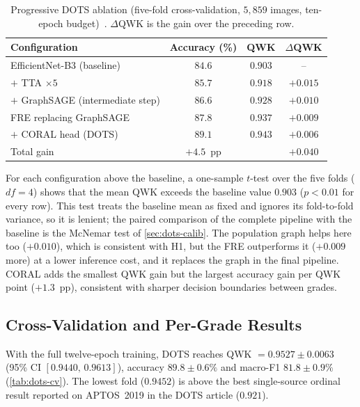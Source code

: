 \begin{table}[!htbp]
\centering
\caption[Progressive DOTS ablation]{Progressive DOTS ablation (five-fold cross-validation,
$5{,}859$ images, ten-epoch budget)~\cite{belhadj2026dots}. $\Delta$QWK is the gain over the
preceding row.}
\label{tab:ablate}
\small
\begin{tabular}{@{}lccc@{}}
\toprule
Configuration & Accuracy (\%) & QWK & $\Delta$QWK \\
\midrule
EfficientNet-B3 (baseline) & $84.6$ & $0.903$ & -- \\
$+$ TTA $\times5$ & $85.7$ & $0.918$ & $+0.015$ \\
$+$ GraphSAGE (intermediate step) & $86.6$ & $0.928$ & $+0.010$ \\
FRE replacing GraphSAGE & $87.8$ & $0.937$ & $+0.009$ \\
$+$ CORAL head (DOTS) & $\mathbf{89.1}$ & $\mathbf{0.943}$ & $+0.006$ \\
\midrule
Total gain & $+4.5$~pp & & $+0.040$ \\
\bottomrule
\end{tabular}
\end{table}

For each configuration above the baseline, a one-sample $t$-test over the five folds
($df=4$) shows that the mean QWK exceeds the baseline value $0.903$ ($p<0.01$ for every
row). This test treats the baseline mean as fixed and ignores its fold-to-fold variance,
so it is lenient; the paired comparison of the complete pipeline with the baseline is the
McNemar test of \cref{sec:dots-calib}. The population graph
helps here too ($+0.010$), which is consistent with H1, but the FRE outperforms it
($+0.009$ more) at a lower inference cost, and it replaces the graph in the final
pipeline. CORAL adds the smallest QWK gain but the largest accuracy gain per QWK point
($+1.3$~pp), consistent with sharper decision boundaries between grades.

\subsection{Cross-Validation and Per-Grade Results}

With the full twelve-epoch training, DOTS reaches QWK $=0.9527\pm0.0063$ (95\% CI
$[0.9440,\,0.9613]$), accuracy $89.8\pm0.6\%$ and macro-F1 $81.8\pm0.9\%$
(\cref{tab:dots-cv}). The lowest fold ($0.9452$) is above the best single-source ordinal
result reported on APTOS~2019 in the DOTS article ($0.921$).

